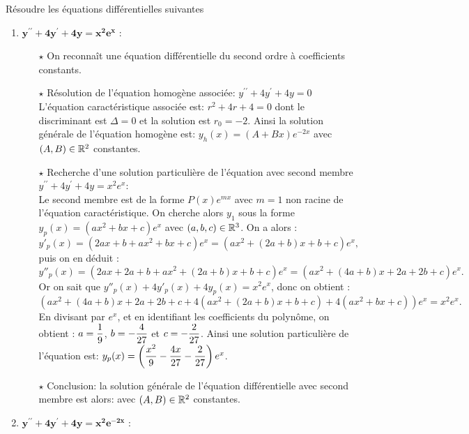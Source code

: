 \documentclass[a4paper, 11pt,reqno]{article}
\begin{document}
\begin{correction}  \;
  R\'esoudre les \'equations diff\'erentielles suivantes
  \begin{enumerate}
    \item  $\mathbf{y^{\prime\prime}+4y^{\prime}+4y=x^2e^x}$ :\\
          \begin{itemize}
            \item[$\star$] On reconna\^{i}t une \'equation diff\'erentielle du second ordre \`{a} coefficients constants.
            \item[$\star$] R\'esolution de l'\'equation homog\`{e}ne associ\'ee: $y^{\prime\prime}+4y^{\prime}+4y=0$\\
                  \noindent L'\'equation caract\'eristique associ\'ee est: $r^2+4r+4=0$ dont le discriminant est $\Delta=0$ et la solution est $r_0=-2$. Ainsi la solution g\'en\'erale de l'\'equation homog\`{e}ne est: $y_h(x)= (A +B x)e^{-2x}$ avec $(A,B)\in\mathbb{R}^2$ constantes.
            \item[$\star$] Recherche d'une solution particuli\`{e}re de l'\'equation avec second membre $y^{\prime\prime}+4y^{\prime}+4y=x^2e^x$:\\
                  \noindent Le second membre est de la forme $P(x) e^{mx}$ avec $m=1$ non racine de l'\'equation caract\'eristique. On cherche alors $y_1$ sous la forme $y_p(x)=(ax^2+bx+c)e^{x}$ avec $(a,b,c)\in\mathbb{R}^3$. On a alors :
                  $$y'_p(x) = (2ax+b+ax^2+bx+c)e^x = (ax^2+(2a+b)x+b+c)e^x,$$
                  puis on en d\'eduit :
                  $$y''_p(x)=(2ax+2a+b+ax^2+(2a+b)x+b+c)e^x = (ax^2+(4a+b)x+2a+2b+c)e^x.$$
                  Or on sait que $y''_p(x) + 4y'_p(x) + 4y_p(x) = x^2e^x$, donc on obtient :
                  $$(ax^2+(4a+b)x+2a+2b+c + 4(ax^2+(2a+b)x+b+c) +4(ax^2+bx+c))e^x = x^2e^x.$$
                  En divisant par $e^x$, et en identifiant les coefficients du polyn\^{o}me, on obtient : $a=\displaystyle\frac{1}{9}$, $b=-\displaystyle\frac{4}{27}$ et $c=-\displaystyle\frac{2}{27}$. Ainsi une solution particuli\`{e}re de l'\'equation est: $y_p(x)= \left( \displaystyle\frac{x^2}{9}-\displaystyle\frac{4x}{27}-\displaystyle\frac{2}{27}\right) e^x$.
            \item[$\star$] Conclusion: la solution g\'en\'erale de l'\'equation diff\'erentielle avec second membre est alors:  avec $(A,B)\in\mathbb{R}^2$ constantes.
          \end{itemize}
    \item $\mathbf{y^{\prime\prime}+4y^{\prime}+4y=x^2e^{-2x}}$ :\\

\end{enumerate}
\end{correction}
\end{document}
